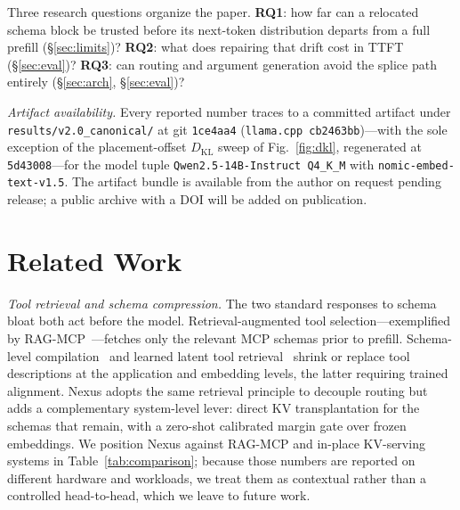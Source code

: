 \documentclass[10pt,conference]{IEEEtran}
\newcommand{\code}[1]{\texttt{\small #1}}
\begin{document}
Three research questions organize the paper. \textbf{RQ1}: how far can a relocated schema block be
trusted before its next-token distribution departs from a full prefill (\S\ref{sec:limits})?
\textbf{RQ2}: what does repairing that drift cost in TTFT (\S\ref{sec:eval})? \textbf{RQ3}: can
routing and argument generation avoid the splice path entirely (\S\ref{sec:arch},
\S\ref{sec:eval})?

\emph{Artifact availability.} Every reported number traces to a committed artifact under
\code{results/v2.0\_canonical/} at git \code{1ce4aa4} (\code{llama.cpp cb2463bb})---with the sole
exception of the placement-offset $D_{\mathrm{KL}}$ sweep of Fig.~\ref{fig:dkl}, regenerated at
\code{5d43008}---for the model
tuple \code{Qwen2.5-14B-Instruct Q4\_K\_M} with \code{nomic-embed-text-v1.5}. The artifact bundle
is available from the author on request pending release; a public archive with a DOI will be added
on publication.

\section{Related Work}
\label{sec:related}
\emph{Tool retrieval and schema compression.} The two standard responses to schema bloat both
act before the model. Retrieval-augmented tool selection---exemplified by
RAG-MCP~\cite{ragmcp2025}---fetches only the relevant MCP schemas prior to prefill. Schema-level
compilation~\cite{tscg2026} and learned latent tool retrieval~\cite{ntilc2026} shrink or replace
tool descriptions at the application and embedding levels, the latter requiring trained
alignment. Nexus adopts the same retrieval principle to decouple routing but adds a complementary
system-level lever: direct KV transplantation for the schemas that remain, with a zero-shot
calibrated margin gate over frozen embeddings. We position Nexus against RAG-MCP and in-place
KV-serving systems in Table~\ref{tab:comparison}; because those numbers are reported on different
hardware and workloads, we treat them as contextual rather than a controlled head-to-head, which
we leave to future work.
\end{document}
